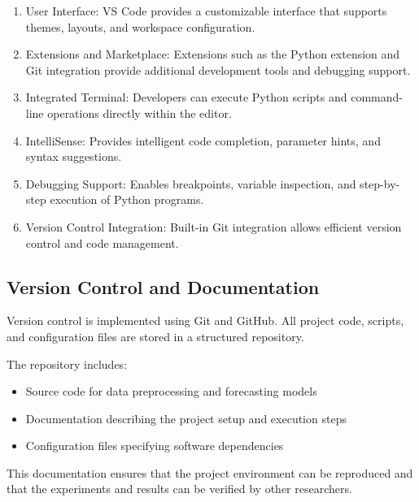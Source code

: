 \begin{enumerate}
	
	\item User Interface: VS Code provides a customizable interface that supports themes, layouts, and workspace configuration.
	
	\item Extensions and Marketplace: Extensions such as the Python extension and Git integration provide additional development tools and debugging support.
	
	\item Integrated Terminal: Developers can execute Python scripts and command-line operations directly within the editor.
	
	\item IntelliSense: Provides intelligent code completion, parameter hints, and syntax suggestions.
	
	\item Debugging Support: Enables breakpoints, variable inspection, and step-by-step execution of Python programs.
	
	\item Version Control Integration: Built-in Git integration allows efficient version control and code management.
	
\end{enumerate}

\subsection{Version Control and Documentation}

Version control is implemented using Git and GitHub. All project code, scripts, and configuration files are stored in a structured repository.

The repository includes:

\begin{itemize}
	\item Source code for data preprocessing and forecasting models
	\item Documentation describing the project setup and execution steps
	\item Configuration files specifying software dependencies
\end{itemize}

This documentation ensures that the project environment can be reproduced and that the experiments and results can be verified by other researchers.
